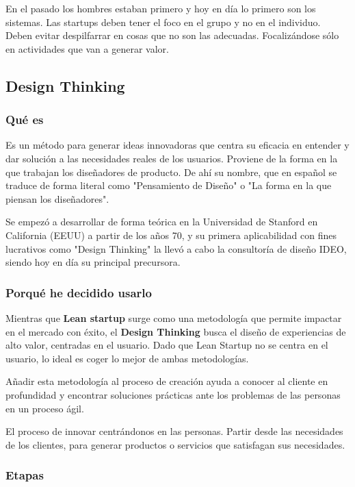 \documentclass[12pt,twoside,titlepage]{report}
\begin{document}
En el pasado los hombres estaban primero y hoy en día lo primero son los sistemas. Las startups deben tener el foco en el grupo y no en el individuo. Deben evitar despilfarrar en cosas que no son las adecuadas. Focalizándose sólo en actividades que van a generar valor.

\subsection{Design Thinking}

\subsubsection{Qué es}

Es un método para generar ideas innovadoras que centra su eficacia en entender y dar solución a las necesidades reales de los usuarios. Proviene de la forma en la que trabajan los diseñadores de producto. De ahí su nombre, que en español se traduce de forma literal como "Pensamiento de Diseño" o "La forma en la que piensan los diseñadores".

Se empezó a desarrollar de forma teórica en la Universidad de Stanford en California (EEUU) a partir de los años 70, y su primera aplicabilidad con fines lucrativos como "Design Thinking" la llevó a cabo la consultoría de diseño IDEO, siendo hoy en día su principal precursora.

\subsubsection{Porqué he decidido usarlo}

Mientras que \textbf{Lean startup} surge como una metodología que permite impactar en el mercado con éxito, el \textbf{Design Thinking} busca el diseño de experiencias de alto valor, centradas en el usuario.
Dado que Lean Startup no se centra en el usuario, lo ideal es coger lo mejor de ambas metodologías.

Añadir esta metodología al proceso de creación ayuda a conocer al cliente en profundidad y encontrar soluciones prácticas ante los problemas de las personas en un proceso ágil. 

El proceso de innovar centrándonos en las personas. Partir desde las necesidades de los clientes, para generar productos o servicios que satisfagan sus necesidades.

\subsubsection{Etapas}
\end{document}
